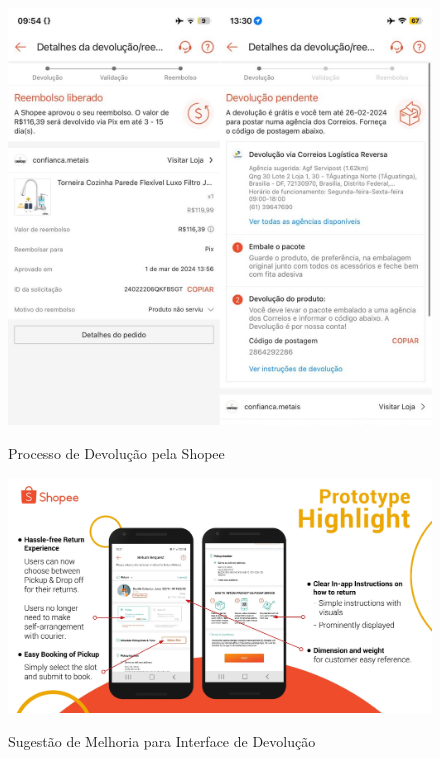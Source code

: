 \begin{figure}[ht]
    \centering
    \caption{Processo de Devolução pela Shopee}
    \includegraphics[keepaspectratio=true,scale=0.3]{figuras/shopee2.jpg}
    \label{s2}
\end{figure}

\begin{figure}[ht]
    \centering
    \caption{Sugestão de Melhoria para Interface de Devolução}
    \includegraphics[keepaspectratio=true,scale=0.3]{figuras/melhoria.PNG}
    \label{melhoria}
\end{figure}

